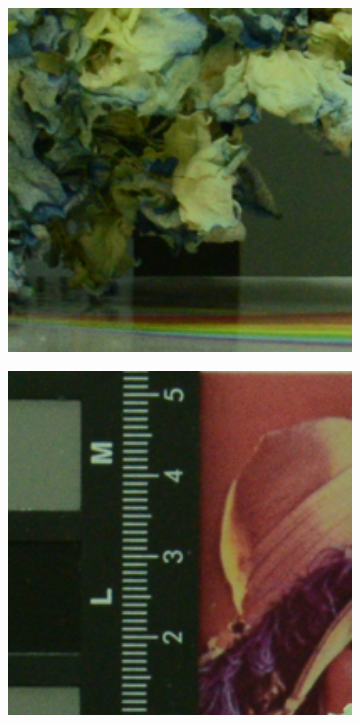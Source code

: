 \begin{figure}
\begin{subfigure}[t]{0.19\textwidth}
    \end{subfigure}
    \hfill
    \begin{subfigure}[t]{0.19\textwidth}
        \centering
        \includegraphics[width=1\textwidth]{images/mcwnnm/resize_d800_iso1600_1_real.png}
    \end{subfigure}
    \hfill
    \begin{subfigure}[t]{0.19\textwidth}
        \centering
        \includegraphics[width=1\textwidth]{images/mcwnnm/resize_d800_iso1600_2_real.png}

\end{subfigure}
\end{figure}
